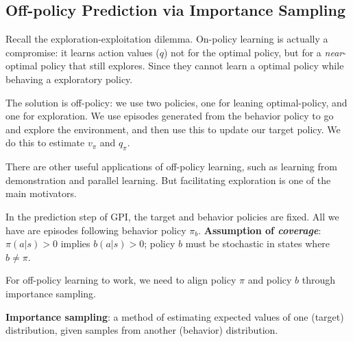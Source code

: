 \documentclass[sutton_barto_notes.tex]{subfiles}
\begin{document}
\subsection{Off-policy Prediction via Importance Sampling}

Recall the exploration-exploitation dilemma. On-policy learning is actually a compromise: it learns action values ($q$) not for the optimal policy, but for a \textit{near}-optimal policy that still explores. Since they cannot learn a optimal policy while behaving a exploratory policy.

The solution is off-policy: we use two policies, one for leaning optimal-policy, and one for exploration. We use episodes generated from the behavior policy to go and explore the environment, and then use this to update our target policy. We do this to estimate $v_\pi$ and $q_\pi$.

There are other useful applications of off-policy learning, such as learning from demonstration and parallel learning. But facilitating exploration is one of the main motivators.

In the prediction step of GPI, the target and behavior policies are fixed. All we have are episodes following behavior policy $\pi_b$. \textbf{Assumption of \textit{coverage}}: $\pi(a|s) > 0$ implies $b(a|s) > 0$; policy $b$ must be stochastic in states where $b \neq \pi$.

For off-policy learning to work, we need to align policy $\pi$ and policy $b$ through importance sampling.
\begin{definition}
\textbf{Importance sampling}: a method of estimating expected values of one (target) distribution, given samples from another (behavior) distribution.
\end{definition}
\end{document}

